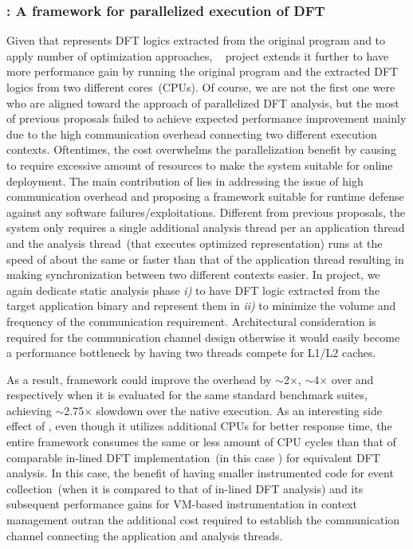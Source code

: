 \documentclass[letterpaper, 10pt]{article}
\begin{document}
\begin{small}
\subsubsection*{\SR: A framework for parallelized execution of DFT}
%
Given that \TFA represents DFT logics extracted from the original program and
to apply number of optimization approaches, \SR~\cite{sreplica:2013ccs} project
extends it further to have more performance gain by running the original
program and the extracted DFT logics from two different cores~(CPUs).
%
Of course, we are not the first one were who are aligned toward the approach of
parallelized DFT analysis, but the most of previous proposals failed to achieve
expected performance improvement mainly due to the high communication overhead
connecting two different execution contexts. Oftentimes, the cost overwhelms
the parallelization benefit by causing to require excessive amount of resources
to make the system suitable for online deployment.
%
The main contribution of \SR lies in addressing the issue of high communication
overhead and proposing a framework  suitable for runtime defense against any
software failures/exploitations. Different from previous proposals, the system
only requires a single additional analysis thread per an application thread and
the analysis thread~(that executes optimized \TFA representation) runs at the
speed of about the same or faster than that of the application thread resulting
in making synchronization between two different contexts easier.
%
In \SR project, we again dedicate static analysis phase {\it i)} to have DFT
logic extracted from the target application binary and represent them in \TFA
{\it ii)} to minimize the volume and frequency of the communication
requirement.
%
Architectural consideration is required for the communication channel design
otherwise it would easily become a performance bottleneck by having two threads
compete for L1/L2 caches.

%
%
%
As a result, \SR framework could improve the overhead by $\sim$2$\times$,
$\sim$4$\times$ over \TFA and \libdft respectively when it is evaluated for the
same standard benchmark suites, achieving $\sim$2.75$\times$ slowdown over the
native execution.
%
As an interesting side effect of \SR, even though it utilizes additional CPUs
for better response time, the entire framework consumes the same or less amount
of CPU cycles than that of comparable in-lined DFT implementation~(in this case
\TFA) for equivalent DFT analysis.
%
In this case, the benefit of having smaller instrumented code for event
collection~(when it is compared to that of in-lined DFT analysis) and its
subsequent performance gains for VM-based instrumentation in context management
outran the additional cost required to establish the communication channel
connecting the application and analysis threads.


\end{small}
\end{document}
